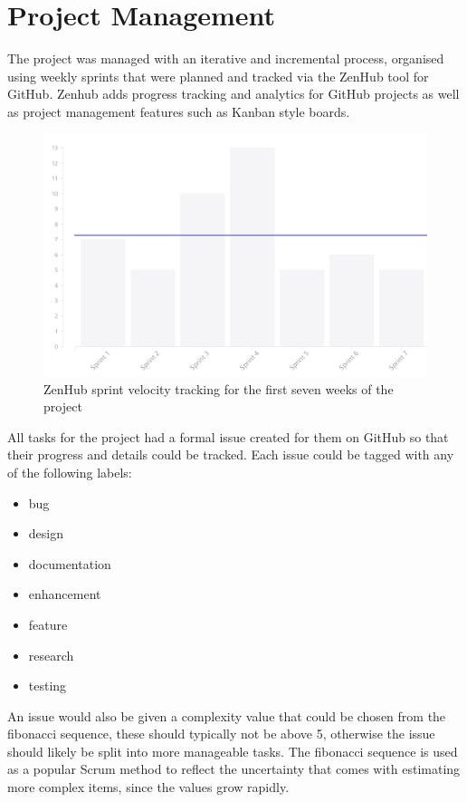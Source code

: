\section{Project Management}\label{sec:project-management}
The project was managed with an iterative and incremental process, organised using weekly sprints that were planned and tracked via the ZenHub\cite{_zenhub_????} tool for GitHub. Zenhub adds progress tracking and analytics for GitHub projects as well as project management features such as Kanban style boards.

\begin{figure}
  \vspace{-2mm}
  \centering
  \includegraphics[width=\linewidth]{img/velocity-tracking.png}
  \caption{ZenHub sprint velocity tracking for the first seven weeks of the project}\label{fig:velocity-tracking}
\end{figure}

All tasks for the project had a formal issue created for them on GitHub so that their progress and details could be tracked. Each issue could be tagged with any of the following labels:
\begin{itemize}[noitemsep]
  \item bug
  \item design
  \item documentation
  \item enhancement
  \item feature
  \item research
  \item testing
\end{itemize}

An issue would also be given a complexity value that could be chosen from the fibonacci sequence, these should typically not be above 5, otherwise the issue should likely be split into more manageable tasks. The fibonacci sequence is used as a popular Scrum method to reflect the uncertainty that comes with estimating more complex items, since the values grow rapidly.

